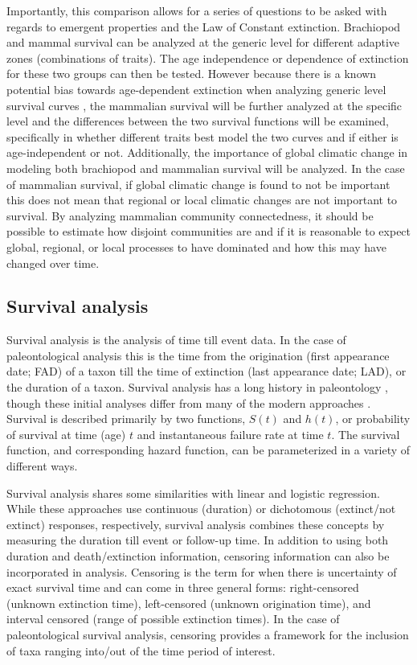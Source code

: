 \documentclass[12pt,letterpaper]{article}
\begin{document}
Importantly, this comparison allows for a series of questions to be asked with regards to emergent properties and the Law of Constant extinction. Brachiopod and mammal survival can be analyzed at the generic level for different adaptive zones (combinations of traits). The age independence or dependence of extinction for these two groups can then be tested. However because there is a known potential bias towards age-dependent extinction when analyzing generic level survival curves \citep{Simpson2006,Raup1978,Raup1991a}, the mammalian survival will be further analyzed at the specific level and the differences between the two survival functions will be examined, specifically in whether different traits best model the two curves and if either is age-independent or not. Additionally, the importance of global climatic change in modeling both brachiopod and  mammalian survival will be analyzed. In the case of mammalian survival, if global climatic change is found to not be important this does not mean that regional or local climatic changes are not important to survival. By analyzing mammalian community connectedness, it should be possible to estimate how disjoint communities are and if it is reasonable to expect global, regional, or local processes to have dominated and how this may have changed over time.

\subsection{Survival analysis} \label{sec:surv}
Survival analysis is the analysis of time till event data. In the case of paleontological analysis this is the time from the origination (first appearance date; FAD) of a taxon till the time of extinction (last appearance date; LAD), or the duration of a taxon. Survival analysis has a long history in paleontology \citep{Simpson1944,VanValen1973}, though these initial analyses differ from many of the modern approaches \citep{Kleinbaum2005}. Survival is described primarily by two functions, \(S(t)\) and \(h(t)\), or probability of survival at time (age) \(t\) and instantaneous failure rate at time \(t\). The survival function, and corresponding hazard function, can be parameterized in a variety of different ways. 

Survival analysis shares some similarities with linear and logistic regression. While these approaches use continuous (duration) or dichotomous (extinct/not extinct) responses, respectively, survival analysis combines these concepts by measuring the duration till event or follow-up time. In addition to using both duration and death/extinction information, censoring information can also be incorporated in analysis. Censoring is the term for when there is uncertainty of exact survival time and can come in three general forms: right-censored (unknown extinction time), left-censored (unknown origination time), and interval censored (range of possible extinction times). In the case of paleontological survival analysis, censoring provides a framework for the inclusion of taxa ranging into/out of the time period of interest.
\end{document}
